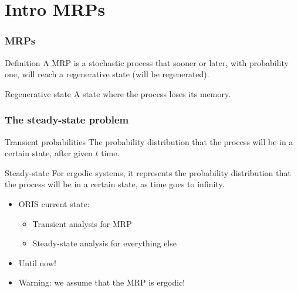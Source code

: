 \begin{frame}[plain]
  \titlepage
\end{frame}

\section{Intro \acfp{MRP}}
\begin{frame}
  \frametitle{\acfp{MRP}}
  \begin{block}{Definition}
    A \acf{MRP} is a stochastic process that sooner or later, with
    probability one, will
    reach a \alert{regenerative} state (will be regenerated).
  \end{block}
  \pause
  \begin{block}{Regenerative state}
    A state where the process loses its memory. 
  \end{block}
  \pause
  \begin{center}    
  \end{center}
\end{frame}

\begin{frame}
  \frametitle{The steady-state problem}
  \pause
  \begin{block}{Transient probabilities}
    The probability distribution that the process will be in a certain
    state, after given $t$ time.
  \end{block}
  \pause
  \begin{block}{Steady-state}
    For ergodic systems, it represents the probability distribution
    that the
    process will be in a certain state, as time goes to infinity.
  \end{block}
  \pause
  \begin{itemize}
  \item ORIS current state:
    \begin{itemize}
    \item Transient analysis for \acf{MRP}
    \item Steady-state analysis for everything else
    \end{itemize}
    \pause
  \item Until now! 
    \pause
  \item \alert{Warning:} we assume that the \acs{MRP} is ergodic!
  \end{itemize}
\end{frame}

